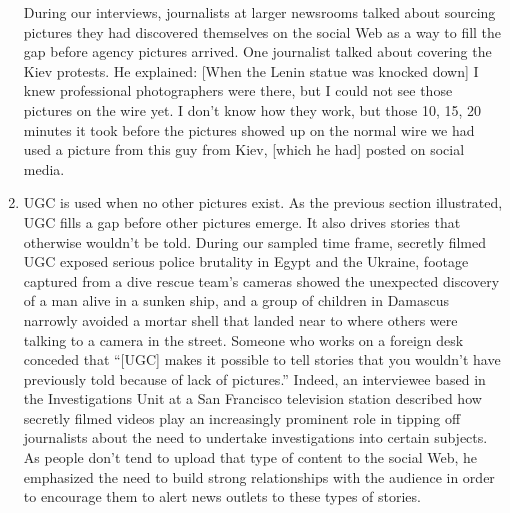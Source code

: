 \documentclass[symmetric, notoc, nobib]{towcenter-book}
\begin{document}
\begin{enumerate}
During our interviews, journalists at larger newsrooms talked about sourcing
pictures they had discovered themselves on the social Web as a way to
fill the gap before agency pictures arrived. One journalist talked about covering
the Kiev protests. He explained:
[When the Lenin statue was knocked down] I knew professional
photographers were there, but I could not see those pictures on the
wire yet. I don't know how they work, but those 10, 15, 20 minutes
it took before the pictures showed up on the normal wire we had
used a picture from this guy from Kiev, [which he had] posted on
social media.
\item UGC is used when no other pictures exist.
As the previous section illustrated, UGC fills a gap before other pictures
emerge. It also drives stories that otherwise wouldn't be told. During our
sampled time frame, secretly filmed UGC exposed serious police brutality
in Egypt and the Ukraine, footage captured from a dive rescue team's cameras
showed the unexpected discovery of a man alive in a sunken ship, and a
group of children in Damascus narrowly avoided a mortar shell that landed
near to where others were talking to a camera in the street.
Someone who works on a foreign desk conceded that ``[UGC] makes it possible
to tell stories that you wouldn't have previously told because of lack
of pictures.'' Indeed, an interviewee based in the Investigations Unit at a
San Francisco television station described how secretly filmed videos play
an increasingly prominent role in tipping off journalists about the need
to undertake investigations into certain subjects. As people don't tend to
upload that type of content to the social Web, he emphasized the need to
build strong relationships with the audience in order to encourage them to
alert news outlets to these types of stories.


\end{enumerate}
\end{document}
